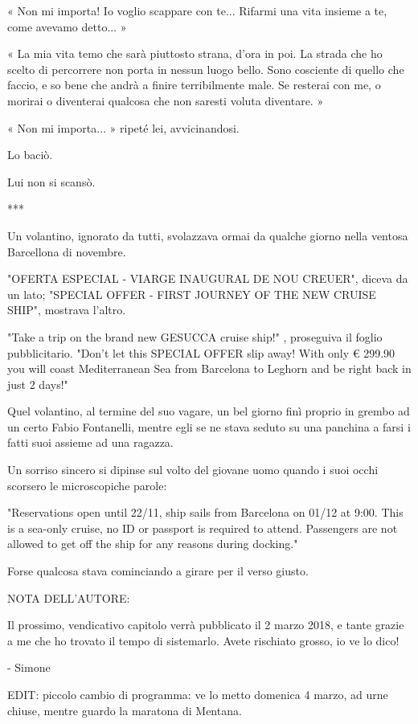 « Non mi importa! Io voglio scappare con te... Rifarmi una vita insieme a te, come avevamo detto... »

« La mia vita temo che sarà piuttosto strana, d'ora in poi. La strada che ho scelto di percorrere non porta in nessun luogo bello. Sono cosciente di quello che faccio, e so bene che andrà a finire terribilmente male. Se resterai con me, o morirai o diventerai qualcosa che non saresti voluta diventare. »

« Non mi importa... » ripeté lei, avvicinandosi.

Lo baciò.

Lui non si scansò.

***

Un volantino, ignorato da tutti, svolazzava ormai da qualche giorno nella ventosa Barcellona di novembre.

"OFERTA ESPECIAL - VIARGE INAUGURAL DE NOU CREUER", diceva da un lato; "SPECIAL OFFER - FIRST JOURNEY OF THE NEW CRUISE SHIP", mostrava l'altro.

"Take a trip on the brand new GESUCCA cruise ship!" , proseguiva il foglio pubblicitario. "Don't let this SPECIAL OFFER slip away! With only € 299.90 you will coast Mediterranean Sea from Barcelona to Leghorn and be right back in just 2 days!"

Quel volantino, al termine del suo vagare, un bel giorno finì proprio in grembo ad un certo Fabio Fontanelli, mentre egli se ne stava seduto su una panchina a farsi i fatti suoi assieme ad una ragazza.

Un sorriso sincero si dipinse sul volto del giovane uomo quando i suoi occhi scorsero le microscopiche parole:

"Reservations open until 22/11, ship sails from Barcelona on 01/12 at 9:00. This is a sea-only cruise, no ID or passport is required to attend. Passengers are not allowed to get off the ship for any reasons during docking."

Forse qualcosa stava cominciando a girare per il verso giusto.


NOTA DELL'AUTORE:

Il prossimo, vendicativo capitolo verrà pubblicato il 2 marzo 2018, e tante grazie a me che ho trovato il tempo di sistemarlo. Avete rischiato grosso, io ve lo dico!

- Simone

EDIT: piccolo cambio di programma: ve lo metto domenica 4 marzo, ad urne chiuse, mentre guardo la maratona di Mentana.



